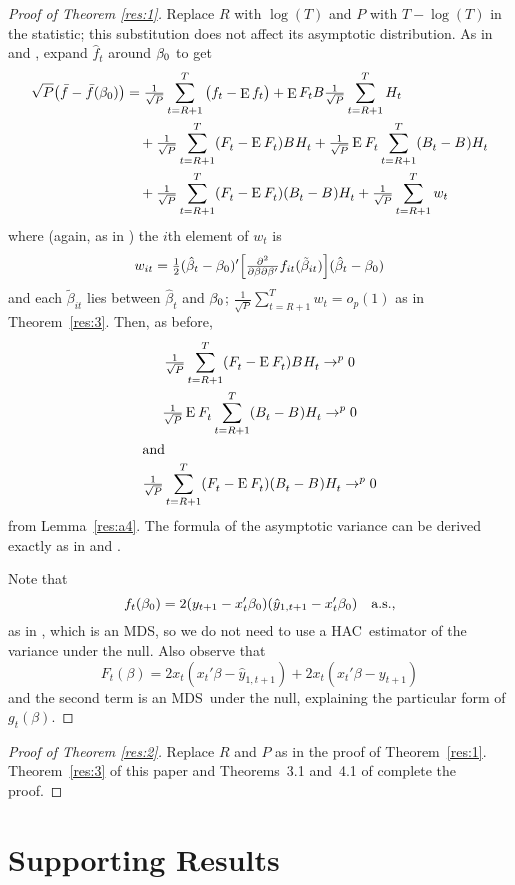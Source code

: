 \documentclass[12pt,fleqn]{article}
\theoremstyle{definition}
\DeclareMathOperator{\E}{E}
\newcommand{\btrue}[1][]{\if#1*\hat\beta_{T+1}\else\beta_0\fi}
\newcommand{\osum}[1]{\sum_{#1=R+1}^T}
\newcommand{\oclt}[1]{\tfrac{1}{\sqrt{P}} \osum{#1}}
\newcommand{\hac}{HAC}
\newcommand{\mds}{MDS}
\begin{document}
\begin{proof}[Proof of Theorem \ref{res:1}]
  Replace $R$ with $\log(T)$ and $P$ with $T - \log(T)$ in the
  statistic; this substitution does not affect its asymptotic
  distribution.
  As in \citet{Wes:96} and \citet{WeM:98}, expand $\hat f_t$ around
  $\btrue$ to get
  \begin{align*}
    \sqrt{P} \big(\bar{f} - \bar{f}(\btrue)\big) &= \oclt{t}
    \big(f_t - \E f_t\big) +
    \E F_t B \oclt{t} H_t \\
    & \quad + \WesA + \WesB \\ & \quad + \WesC + \oclt{t} w_t
  \end{align*}
  where (again, as in \citealp{Wes:96}) the $i$th element of $w_t$ is
  \begin{equation*}
    w_{it} = \tfrac12 (\hat\beta_t - \btrue)'
    \Big[\tfrac{\partial^2}{\partial \beta \partial\beta'}
    f_{it}(\tilde\beta_{it}) \Big]
    (\hat\beta_t - \btrue)
  \end{equation*}
  and each $\tilde\beta_{it}$ lies between $\hat\beta_t$ and
  $\btrue$; $\oclt{t} w_t = o_{p}(1)$ as in Theorem~\ref{res:3}.
  Then, as before,
  \begin{gather}
    \WesA \to^{p} 0 \label{eq:11} \\
    \WesB \to^{p} 0 \label{eq:12}\\
  \intertext{and}
    \WesC \to^{p} 0 \label{eq:13}
  \end{gather}
  from Lemma~\ref{res:a4}.  The formula of the asymptotic variance can
  be derived exactly as in \citet{Wes:96} and \citet{WeM:98}.

  Note that \[f_t(\btrue)= 2 (y_{t+1} -
  x_t'\btrue)(\hat{y}_{1,t+1} - x_t'\btrue) \quad \text{a.s.},\] as
  in \citet{ClW:07}, which is an \mds, so we do not need to use a
  \hac\ estimator of the variance under the null.  Also observe that
  \[F_t(\beta) = 2 x_t(x_t'\beta - \hat y_{1,t+1}) + 2 x_t(x_t'\beta -
  y_{t+1})\] and the second term is an \mds\ under the null,
  explaining the particular form of $g_t(\beta)$.
\end{proof}

\begin{proof}[Proof of Theorem \ref{res:2}]
  Replace $R$ and $P$ as in the proof of Theorem~\ref{res:1}.
  Theorem~\ref{res:3} of this paper and Theorems~3.1 and~4.1 of
  \citet{RoW:05} complete the proof.
\end{proof}

\section{Supporting Results}
\end{document}
